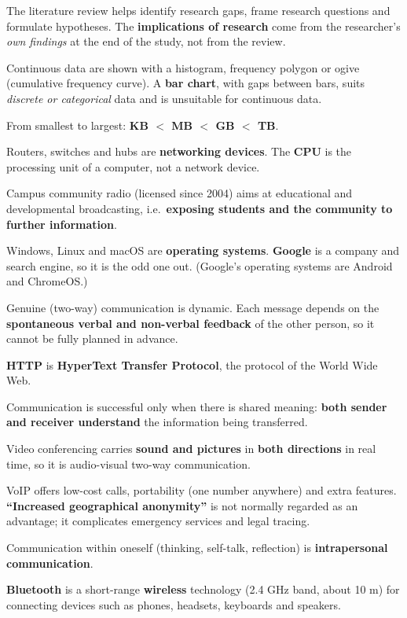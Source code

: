 The literature review helps identify research gaps, frame research questions and formulate hypotheses. The \textbf{implications of research} come from the researcher's \emph{own findings} at the end of the study, not from the review.

Continuous data are shown with a histogram, frequency polygon or ogive (cumulative frequency curve). A \textbf{bar chart}, with gaps between bars, suits \emph{discrete or categorical} data and is unsuitable for continuous data.

From smallest to largest: \textbf{KB $<$ MB $<$ GB $<$ TB}.

Routers, switches and hubs are \textbf{networking devices}. The \textbf{CPU} is the processing unit of a computer, not a network device.

Campus community radio (licensed since 2004) aims at educational and developmental broadcasting, i.e.\ \textbf{exposing students and the community to further information}.

Windows, Linux and macOS are \textbf{operating systems}. \textbf{Google} is a company and search engine, so it is the odd one out. (Google's operating systems are Android and ChromeOS.)

Genuine (two-way) communication is dynamic. Each message depends on the \textbf{spontaneous verbal and non-verbal feedback} of the other person, so it cannot be fully planned in advance.

\textbf{HTTP} is \textbf{HyperText Transfer Protocol}, the protocol of the World Wide Web.

Communication is successful only when there is shared meaning: \textbf{both sender and receiver understand} the information being transferred.

Video conferencing carries \textbf{sound and pictures} in \textbf{both directions} in real time, so it is audio-visual two-way communication.

VoIP offers low-cost calls, portability (one number anywhere) and extra features. \textbf{``Increased geographical anonymity''} is not normally regarded as an advantage; it complicates emergency services and legal tracing.

Communication within oneself (thinking, self-talk, reflection) is \textbf{intrapersonal communication}.

\textbf{Bluetooth} is a short-range \textbf{wireless} technology (2.4 GHz band, about 10 m) for connecting devices such as phones, headsets, keyboards and speakers.

